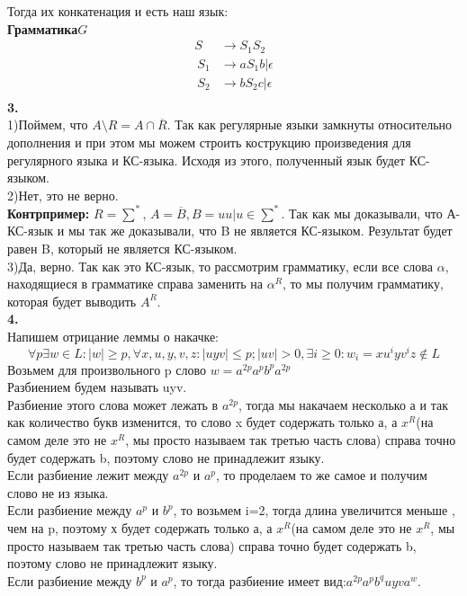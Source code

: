 \documentclass[a4paper,12pt]{article}
\begin{document}
Тогда их конкатенация и есть наш язык:\\
\textbf{Грамматика$ G$}
\begin{align*}
	S&\to S_1S_2\\\
	S_1&\to aS_1b|\epsilon\\\
	S_2&\to bS_2c|\epsilon\\\
\end{align*}
\textbf{3.}\\
1)Поймем, что $A\setminus R=A\cap\overline{R}$. Так как регулярные языки замкнуты относительно дополнения и при этом мы можем строить кострукцию произведения для регулярного языка и КС-языка. Исходя из этого, полученный язык будет КС-языком.\\
2)Нет, это не верно. \\
\textbf{Контрпример:} $R=\sum^*$, $A=\overline{B},B={uu|u\in \sum^* }$. Так как мы доказывали, что А-КС-язык и мы так же доказывали, что B не является КС-языком. Результат будет равен B, который  не является КС-языком.\\
3)Да, верно. Так как это КС-язык, то рассмотрим грамматику, если все слова $\alpha$, находящиеся в грамматике справа заменить на $\alpha^R$, то мы получим грамматику, которая будет выводить $A^R$.\\
\textbf{4.}\\
Напишем отрицание леммы о накачке:\\
\[\forall p \exists w \in L: |w|\geq p, \forall x,u,y,v,z : |uyv|\leq p; |uv|>0, \exists i\geq 0: w_i=xu^iyv^iz \notin L\]
Возьмем для произвольного p слово $w=a^{2p}a^pb^pa^{2p}$\\
Разбиением будем называть uyv.\\
Разбиение этого слова может лежать в $a^{2p}$, тогда мы накачаем несколько а и так как количество букв изменится, то слово x будет содержать только а, а $x^R$(на самом деле это не $x^R$, мы просто называем так третью часть слова) справа точно будет содержать b, поэтому слово не принадлежит языку.\\
Если разбиение лежит между $a^{2p}$ и $a^{p}$, то проделаем то же самое и получим слово не из языка.\\
Если разбиение между $a^{p}$ и $b^{p}$, то возьмем i=2, тогда длина увеличится меньше , чем на p, поэтому х будет содержать только а, а $x^R$(на самом деле это не $x^R$, мы просто называем так третью часть слова) справа точно будет содержать b, поэтому слово не принадлежит языку.\\
Если разбиение между $b^{p}$ и $a^{p}$, то тогда разбиение имеет вид:$a^{2p}a^pb^quyva^{w}$.\\
\end{document}
